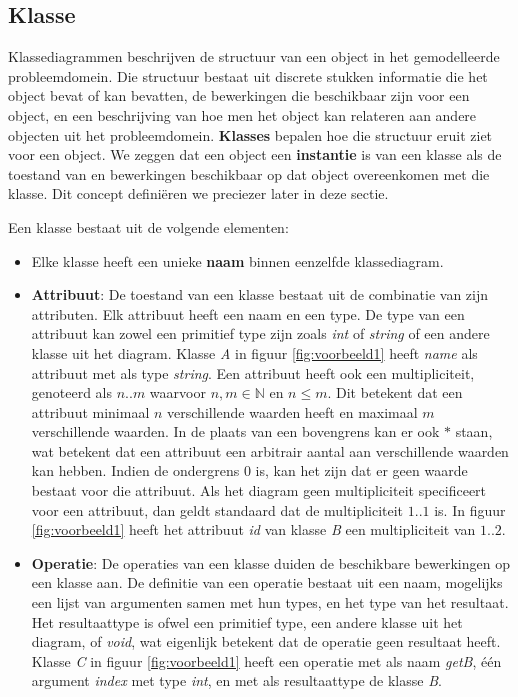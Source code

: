 \subsection{Klasse}

Klassediagrammen beschrijven de structuur van een object in het gemodelleerde probleemdomein. Die structuur bestaat uit discrete stukken informatie die het object bevat of kan bevatten, de bewerkingen die beschikbaar zijn voor een object, en een beschrijving van hoe men het object kan relateren aan andere objecten uit het probleemdomein. \textbf{Klasses} bepalen hoe die structuur eruit ziet voor een object. We zeggen dat een object een \textbf{instantie} is van een klasse als de toestand van en bewerkingen beschikbaar op dat object overeenkomen met die klasse. Dit concept defini\"eren we preciezer later in deze sectie.

Een klasse bestaat uit de volgende elementen:

\begin{itemize}
	\item Elke klasse heeft een unieke \textbf{naam} binnen eenzelfde klassediagram.
	\item \textbf{Attribuut}: De toestand van een klasse bestaat uit de combinatie van zijn attributen. Elk attribuut heeft een naam en een type. De type van een attribuut kan zowel een primitief type zijn zoals \textit{int} of \textit{string} of een andere klasse uit het diagram. Klasse \textit{A} in figuur \ref{fig:voorbeeld1} heeft \textit{name} als attribuut met als type \textit{string}. Een attribuut heeft ook een multipliciteit, genoteerd als $n..m$ waarvoor $n,m \in \mathbb{N}$ en $n \leq m$. Dit betekent dat een attribuut minimaal $n$ verschillende waarden heeft en maximaal $m$ verschillende waarden. In de plaats van een bovengrens kan er ook $*$ staan, wat betekent dat een attribuut een arbitrair aantal aan verschillende waarden kan hebben. Indien de ondergrens 0 is, kan het zijn dat er geen waarde bestaat voor die attribuut. Als het diagram geen multipliciteit specificeert voor een attribuut, dan geldt standaard dat de multipliciteit $1..1$ is. In figuur \ref{fig:voorbeeld1} heeft het attribuut \textit{id} van klasse \textit{B} een multipliciteit van $1..2$.
	\item \textbf{Operatie}: De operaties van een klasse duiden de beschikbare bewerkingen op een klasse aan. De definitie van een operatie bestaat uit een naam, mogelijks een lijst van argumenten samen met hun types, en het type van het resultaat. Het resultaattype is ofwel een primitief type, een andere klasse uit het diagram, of \textit{void}, wat eigenlijk betekent dat de operatie geen resultaat heeft. Klasse \textit{C} in figuur \ref{fig:voorbeeld1} heeft een operatie met als naam \textit{getB}, \'e\'en argument \textit{index} met type \textit{int}, en met als resultaattype de klasse \textit{B}.
\end{itemize}

